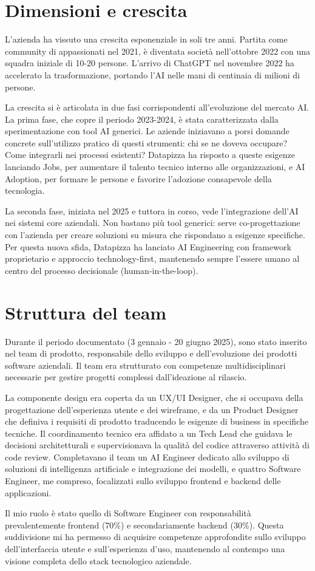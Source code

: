 \section{Dimensioni e crescita}
L'azienda ha vissuto una crescita esponenziale in soli tre anni. Partita 
come community di appassionati nel 2021, è diventata società nell'ottobre 
2022 con una squadra iniziale di 10-20 persone. L'arrivo di ChatGPT nel 
novembre 2022 ha accelerato la trasformazione, portando l'AI nelle mani 
di centinaia di milioni di persone.

\medskip 
La crescita si è articolata in due fasi corrispondenti all'evoluzione del 
mercato AI. La prima fase, che copre il periodo 2023-2024, è stata 
caratterizzata dalla sperimentazione con tool AI generici. Le aziende 
iniziavano a porsi domande concrete sull'utilizzo pratico di questi 
strumenti: chi se ne doveva occupare? Come integrarli nei processi 
esistenti? Datapizza ha risposto a queste esigenze lanciando Jobs, per 
aumentare il talento tecnico interno alle organizzazioni, e AI Adoption, 
per formare le persone e favorire l'adozione consapevole della tecnologia.

\medskip 
La seconda fase, iniziata nel 2025 e tuttora in corso, vede 
l'integrazione dell'AI nei sistemi core aziendali. Non bastano più tool 
generici: serve co-progettazione con l'azienda per creare soluzioni su 
misura che rispondano a esigenze specifiche. Per questa nuova sfida, 
Datapizza ha lanciato AI Engineering con framework proprietario e 
approccio technology-first, mantenendo sempre l'essere umano al centro 
del processo decisionale (human-in-the-loop).

\section{Struttura del team}
Durante il periodo documentato (3 gennaio - 20 giugno 2025), sono stato 
inserito nel team di prodotto, responsabile dello sviluppo e 
dell'evoluzione dei prodotti software aziendali. Il team era strutturato 
con competenze multidisciplinari necessarie per gestire progetti complessi 
dall'ideazione al rilascio.

\medskip 
La componente design era coperta da un UX/UI Designer, che si occupava 
della progettazione dell'esperienza utente e dei wireframe, e da un 
Product Designer che definiva i requisiti di prodotto traducendo le 
esigenze di business in specifiche tecniche. Il coordinamento tecnico era 
affidato a un Tech Lead che guidava le decisioni architetturali e 
supervisionava la qualità del codice attraverso attività di code review. 
Completavano il team un AI Engineer dedicato allo sviluppo di soluzioni 
di intelligenza artificiale e integrazione dei modelli, e quattro Software 
Engineer, me compreso, focalizzati sullo sviluppo frontend e backend delle 
applicazioni.

\medskip 
Il mio ruolo è stato quello di Software Engineer con responsabilità 
prevalentemente frontend (70\%) e secondariamente backend (30\%). Questa 
suddivisione mi ha permesso di acquisire competenze approfondite sullo 
sviluppo dell'interfaccia utente e sull'esperienza d'uso, mantenendo al 
contempo una visione completa dello stack tecnologico aziendale.